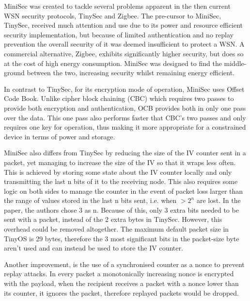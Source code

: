 MiniSec was created to tackle several problems apparent in the then current WSN security protocols, TinySec and Zigbee. The pre-cursor to MiniSec, TinySec, received much attention and use due to its power and resource efficient security implementation, but because of limited authentication and no replay prevention the overall security of it was deemed insufficient to protect a WSN. A commercial alternative, Zigbee, exhibits significantly higher security, but does so at the cost of high energy consumption. MiniSec was designed to find the middle-ground between the two, increasing security whilst remaining energy efficient. 

In contrast to TinySec, for its encryption mode of operation, MiniSec uses Offset Code Book. Unlike cipher block chaining (CBC) which requires two passes to provide both encryption and authentication, OCB provides both in only one pass over the data. This one pass also performs faster that CBC's two passes and only requires one key for operation, thus making it more appropriate for a constrained device in terms of power and storage. 

MiniSec also differs from TinySec by reducing the size of the IV counter sent in a packet, yet managing to increase the size of the IV so that it wraps less often. This is achieved by storing some state about the IV counter locally and only transmitting the last n bits of it to the receiving node. This also requires some logic on both sides to manage the counter in the event of packet loss larger than the range of values stored in the last n bits sent, i.e. when $>2^n$ are lost. In the paper, the authors chose 3 as n. Because of this, only 3 extra bits needed to be sent with a packet, instead of the 2 extra bytes in TinySec. However, this overhead could be removed altogether. The maximum default packet size in TinyOS is 29 bytes, therefore the 3 most significant bits in the packet-size byte aren't used and can instead be used to store the IV counter.

Another improvement, is the use of a synchronised counter as a nonce to prevent replay attacks. In every packet a monotonically increasing nonce is encrypted with the payload, when the recipient receives a packet with a nonce lower than its counter, it ignores the packet, therefore replayed packets would be dropped. 
